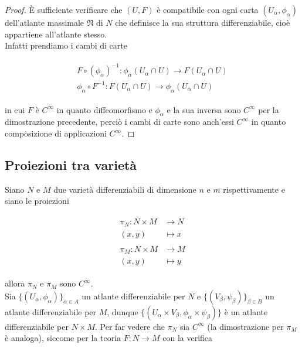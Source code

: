 \begin{proof}
	\`{E} sufficiente verificare che $ (U,F) $ è compatibile con ogni carta $ (U_{\alpha},\phi_{\alpha}) $ dell'atlante massimale $ \mathfrak{N} $ di $ N $ che definisce la sua struttura differenziabile, cioè appartiene all'atlante stesso.\\
	Infatti prendiamo i cambi di carte
	
	\begin{align}
		\begin{split}
			F \circ (\phi_{\alpha})^{-1} : \phi_{\alpha}(U_{\alpha} \cap U) \to F(U_{\alpha} \cap U)\\
			\phi_{\alpha} \circ F^{-1} : F(U_{\alpha} \cap U) \to \phi_{\alpha}(U_{\alpha} \cap U)
		\end{split}	
	\end{align}

	in cui $ F $ è $ C^{\infty} $ in quanto diffeomorfismo e $ \phi_{\alpha} $ e la sua inversa sono $ C^{\infty} $ per la dimostrazione precedente, perciò i cambi di carte sono anch'essi $ C^{\infty} $ in quanto composizione di applicazioni $ C^{\infty} $.
\end{proof}

\subsection{Proiezioni tra varietà}

Siano $ N $ e $ M $ due varietà differenziabili di dimensione $ n $ e $ m $ rispettivamente e siano le proiezioni

\begin{align}
	\begin{split}
		\pi_{N} : N \times M &\to N\\
		(x,y) &\mapsto x\\\\
		\pi_{M} : N \times M &\to M\\
		(x,y) &\mapsto y
	\end{split}	
\end{align}

allora $ \pi_{N} $ e $ \pi_{M} $ sono $ C^{\infty} $.\\
Sia $ \{(U_{\alpha},\phi_{\alpha})\}_{\alpha \in A} $ un atlante differenziabile per $ N $ e $ \{(V_{\beta},\psi_{\beta})\}_{\beta \in B} $ un atlante differenziabile per $ M $, dunque $ \{(U_{\alpha} \times V_{\beta},\phi_{\alpha} \times \psi_{\beta})\} $ è un atlante differenziabile per $ N \times M $. Per far vedere che $ \pi_{N} $ sia $ C^{\infty} $ (la dimostrazione per $ \pi_{M} $ è analoga), siccome per la teoria $ F : N \to M $ con la verifica

